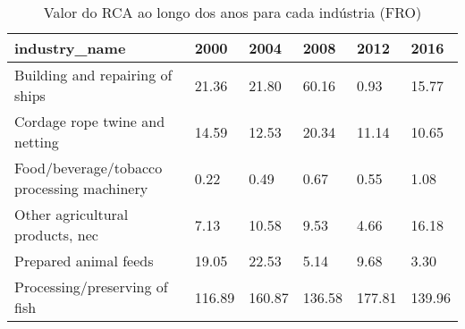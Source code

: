 \begin{table}
\centering
\caption{Valor do RCA ao longo dos anos para cada indústria (FRO)}
\begin{tabular}{p{6cm}p{1.5cm}p{1.5cm}p{1.5cm}p{1.5cm}p{1.5cm}}
\toprule
                             industry\_name &   2000 &   2004 &   2008 &   2012 &   2016 \\
\midrule
           Building and repairing of ships &  21.36 &  21.80 &  60.16 &   0.93 &  15.77 \\
            Cordage rope twine and netting &  14.59 &  12.53 &  20.34 &  11.14 &  10.65 \\
Food/beverage/tobacco processing machinery &   0.22 &   0.49 &   0.67 &   0.55 &   1.08 \\
          Other agricultural products, nec &   7.13 &  10.58 &   9.53 &   4.66 &  16.18 \\
                     Prepared animal feeds &  19.05 &  22.53 &   5.14 &   9.68 &   3.30 \\
             Processing/preserving of fish & 116.89 & 160.87 & 136.58 & 177.81 & 139.96 \\
\bottomrule
\end{tabular}
\end{table}
